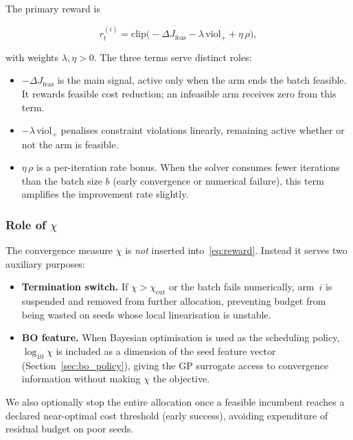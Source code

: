 \documentclass[lettersize,journal]{IEEEtran}
\begin{document}
The primary reward is

\begin{equation}
r^{(i)}_t = \mathrm{clip}\!\Big(-\Delta J_{\mathrm{feas}} - \lambda\,\mathrm{viol}_+ + \eta\,\rho\Big),
\label{eq:reward}
\end{equation}

with weights $\lambda,\eta>0$.  The three terms serve distinct roles:

\begin{itemize}
  \item $-\Delta J_{\mathrm{feas}}$ is the main signal, active only when the
    arm ends the batch feasible.  It rewards feasible cost reduction; an
    infeasible arm receives zero from this term.
  \item $-\lambda\,\mathrm{viol}_+$ penalises constraint violations
    linearly, remaining active whether or not the arm is feasible.
  \item $\eta\,\rho$ is a per-iteration rate bonus.  When the solver
    consumes fewer iterations than the batch size $b$ (early convergence or
    numerical failure), this term amplifies the improvement rate slightly.
\end{itemize}

\subsubsection{Role of $\chi$}

The convergence measure $\chi$ is \emph{not} inserted into~\eqref{eq:reward}.
Instead it serves two auxiliary purposes:
\begin{itemize}
  \item \textbf{Termination switch.} If $\chi>\chi_{\mathrm{cut}}$ or the batch
    fails numerically, arm~$i$ is suspended and removed from further allocation,
    preventing budget from being wasted on seeds whose local linearisation is
    unstable.
  \item \textbf{BO feature.} When Bayesian optimisation is used as the
    scheduling policy, $\log_{10}\chi$ is included as a dimension of the seed
    feature vector (Section~\ref{sec:bo_policy}), giving the GP surrogate
    access to convergence information without making $\chi$ the objective.
\end{itemize}

We also optionally stop the entire allocation once a feasible incumbent reaches
a declared near-optimal cost threshold (early success), avoiding expenditure of
residual budget on poor seeds.
\end{document}
